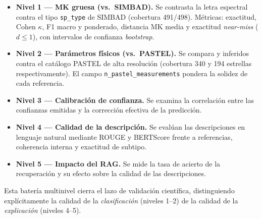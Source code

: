 \begin{itemize}
  \item \textbf{Nivel 1 --- MK gruesa (vs.\ SIMBAD).} Se contrasta la letra
  espectral contra el tipo \verb|sp_type| de SIMBAD (cobertura 491/498). Métricas:
  exactitud, Cohen $\kappa$, F1 macro y ponderado, distancia MK media y exactitud
  \emph{near-miss} ($d\le1$), con intervalos de confianza \emph{bootstrap}.
  \item \textbf{Nivel 2 --- Parámetros físicos (vs.\ PASTEL).} Se compara
  \teff{} y \logg{} inferidos contra el catálogo PASTEL de alta resolución
  (cobertura 340 y 194 estrellas respectivamente). El campo
  \verb|n_pastel_measurements| pondera la solidez de cada referencia.
  \item \textbf{Nivel 3 --- Calibración de confianza.} Se examina la correlación
  entre las confianzas emitidas y la corrección efectiva de la predicción.
  \item \textbf{Nivel 4 --- Calidad de la descripción.} Se evalúan las
  descripciones en lenguaje natural mediante ROUGE y BERTScore frente a
  referencias, coherencia interna y exactitud de subtipo.
  \item \textbf{Nivel 5 --- Impacto del RAG.} Se mide la tasa de acierto de la
  recuperación y su efecto sobre la calidad de las descripciones.
\end{itemize}

Esta batería multinivel cierra el lazo de validación científica, distinguiendo
explícitamente la calidad de la \emph{clasificación} (niveles 1--2) de la calidad
de la \emph{explicación} (niveles 4--5).

